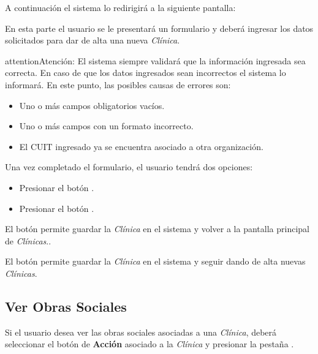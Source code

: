 \documentclass[a4paper,10pt,spanish]{sphinxmanual}
\begin{document}

A continuación el sistema lo redirigirá a la siguiente pantalla:


En esta parte el usuario se le presentará un formulario y deberá ingresar los datos solicitados para dar de alta una nueva \emph{Clínica}.

\begin{notice}{attention}{Atención:}
El sistema siempre validará que la información ingresada sea correcta. En caso de que los datos ingresados sean incorrectos el sistema lo informará.
En este punto, las posibles causas de errores son:
\begin{itemize}
\item {} 
Uno o más campos obligatorios vacíos.

\item {} 
Uno o más campos con un formato incorrecto.

\item {} 
El CUIT ingresado ya se encuentra asociado a otra organización.

\end{itemize}
\end{notice}

Una vez completado el formulario, el usuario tendrá dos opciones:
\begin{itemize}
\item {} 
Presionar el botón .

\item {} 
Presionar el botón .

\end{itemize}

El botón  permite guardar la \emph{Clínica} en el sistema y volver a la pantalla
principal de \emph{Clínicas}..

El botón  permite guardar la \emph{Clínica} en el sistema y seguir dando de alta nuevas \emph{Clínicas}.


\subsection{Ver Obras Sociales}
\label{clinicas:ver-obras-sociales}\label{clinicas:id2}
Si el usuario desea ver las obras sociales asociadas a una \emph{Clínica}, deberá seleccionar el botón de \textbf{Acción} asociado a la \emph{Clínica} y presionar la pestaña .
\end{document}
